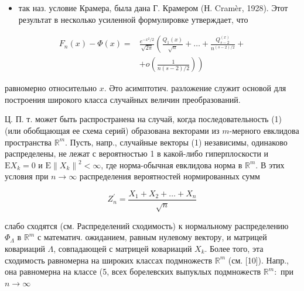 \documentclass[10pt]{article}
\begin{document}
\begin{itemize}

  \item так наз. условие Крамера, была дана Г. Крамером (Н. Cramèr, 1928). Этот результат в несколько усиленной формулировке утверждает, что

\end{itemize}



\[

\begin{aligned}

F_{n}(x)-\Phi(x)= & \frac{e^{-x^{2} / 2}}{\sqrt{2 \pi}}\left(\frac{Q_{1}(x)}{\sqrt{n}}+\ldots+\frac{Q_{s-2}^{(x)}}{n^{(s-2) / 2}}+\right. \\

& \left.+o\left(\frac{1}{n(s-2) / 2}\right)\right)

\end{aligned}

\]



равномерно относительно $x$. Әто асимптотич. разложение служит основой для построения широкого класса случайных величин преобразований.



Ц. П. т. может быть распространена на случай, когда последовательность (1) (или обобщающая ее схема серий) образована векторами из $m$-мерного евклидова пространства $\mathbb{R}^{m}$. Пусть, напр., случайные векторы (1) независимы, одинаково распределены, не лежат с вероятностью 1 в какой-либо гиперплоскости и $\mathrm{E} X_{k}=0$ и $\mathrm{E}\left\|X_{k}\right\|^{2}<\infty$, где норма-обычная евклидова норма в $\mathbb{R}^{m}$. В этих условия при $n \rightarrow \infty$ распределения вероятностей нормированных сумм



\[

Z_{n}^{\prime}=\frac{X_{1}+X_{2}+\ldots+X_{n}}{\sqrt{n}}

\]



слабо сходятся (см. Распределений сходимость) к нормальному распределению $\Phi_{\Lambda}$ в $\mathbb{R}^{m}$ с математич. ожиданием, равным нулевому вектору, и матрицей ковариаций $\Lambda$, совпадающей с матрицей ковариаций $X_{k}$. Более того, эта сходимость равномерна на широких классах подмножеств $\mathbb{R}^{m}$ (см. [10]). Напр., она равномерна на классе (5, всех борелевских выпуклых подмножеств $\mathbb{R}^{m}:$ при $n \rightarrow \infty$
\end{document}
